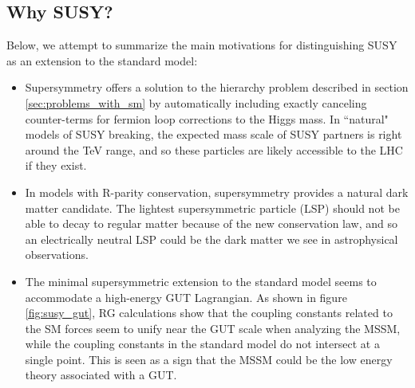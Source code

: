   \subsection{Why SUSY?} \label{sec:why_susy}
    Below, we attempt to summarize the main motivations for distinguishing SUSY as an extension to the standard model:

    \begin{itemize}
    \item Supersymmetry offers a solution to the hierarchy problem described in section \ref{sec:problems_with_sm} by automatically including exactly canceling counter-terms for fermion loop corrections to the Higgs mass. In ``natural" models of SUSY breaking, the expected mass scale of SUSY partners is right around the TeV range, and so these particles are likely accessible to the LHC if they exist.
    \item In models with R-parity conservation, supersymmetry provides a natural dark matter candidate. The lightest supersymmetric particle (LSP) should not be able to decay to regular matter because of the new conservation law, and so an electrically neutral LSP could be the dark matter we see in astrophysical observations.
    \item The minimal supersymmetric extension to the standard model seems to accommodate a high-energy GUT Lagrangian. As shown in figure \ref{fig:susy_gut}, RG calculations show that the coupling constants related to the SM forces seem to unify near the GUT scale when analyzing the MSSM, while the coupling constants in the standard model do not intersect at a single point. This is seen as a sign that the MSSM could be the low energy theory associated with a GUT.
      

\end{itemize}
